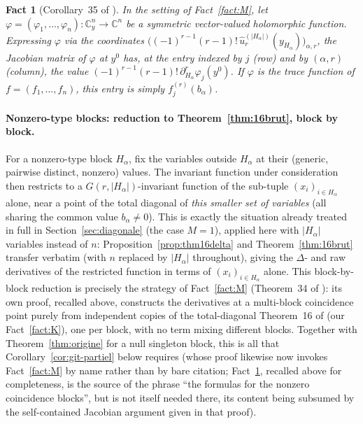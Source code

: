 \documentclass[10pt,a4paper]{amsart}
\newtheorem{fact}[theorem]{Fact}
\newcommand{\CC}{\mathbb{C}}
\begin{document}
\begin{fact}[Corollary~35 of \cite{Ze}]\label{fact:N}
In the setting of Fact~\ref{fact:M}, let $\varphi=(\varphi_1,\dots,\varphi_n):\CC^n_y\to\CC^n$ be a symmetric vector-valued holomorphic function. Expressing $\varphi$ via the coordinates $\big((-1)^{r-1}(r-1)!\,\hat u_r^{(|H_\alpha|)}(y_{H_\alpha})\big)_{\alpha,r}$, the Jacobian matrix of $\varphi$ at $y^0$ has, at the entry indexed by $j$ (row) and by $(\alpha,r)$ (column), the value $(-1)^{r-1}(r-1)!\,\partial_{H_\alpha}^r\varphi_j(y^0)$. If $\varphi$ is the trace function of $f=(f_1,\dots,f_n)$, this entry is simply $f_j^{(r)}(b_\alpha)$.
\end{fact}

\paragraph{Nonzero-type blocks: reduction to Theorem~\ref{thm:16brut}, block by block.} For a nonzero-type block $H_\alpha$, fix the variables outside $H_\alpha$ at their (generic, pairwise distinct, nonzero) values. The invariant function under consideration then restricts to a $G(r,|H_\alpha|)$-invariant function of the sub-tuple $(x_i)_{i\in H_\alpha}$ alone, near a point of the total diagonal of \emph{this smaller set of variables} (all sharing the common value $b_\alpha\ne0$). This is exactly the situation already treated in full in Section~\ref{sec:diagonale} (the case $M=1$), applied here with $|H_\alpha|$ variables instead of $n$: Proposition~\ref{prop:thm16delta} and Theorem~\ref{thm:16brut} transfer verbatim (with $n$ replaced by $|H_\alpha|$ throughout), giving the $\Delta$- and raw derivatives of the restricted function in terms of $(x_i)_{i\in H_\alpha}$ alone. This block-by-block reduction is precisely the strategy of Fact~\ref{fact:M} (Theorem~34 of \cite{Ze}): its own proof, recalled above, constructs the derivatives at a multi-block coincidence point purely from independent copies of the total-diagonal Theorem~16 of \cite{Ze} (our Fact~\ref{fact:K}), one per block, with no term mixing different blocks. Together with Theorem~\ref{thm:origine} for a null singleton block, this is all that Corollary~\ref{cor:git-partiel} below requires (whose proof likewise now invokes Fact~\ref{fact:M} by name rather than by bare citation; Fact~\ref{fact:N}, recalled above for completeness, is the source of the phrase ``the formulas for the nonzero coincidence blocks'', but is not itself needed there, its content being subsumed by the self-contained Jacobian argument given in that proof).
\end{document}
